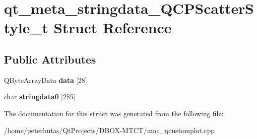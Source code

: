 \hypertarget{structqt__meta__stringdata___q_c_p_scatter_style__t}{}\section{qt\+\_\+meta\+\_\+stringdata\+\_\+\+Q\+C\+P\+Scatter\+Style\+\_\+t Struct Reference}
\label{structqt__meta__stringdata___q_c_p_scatter_style__t}
\subsection*{Public Attributes}
\begin{DoxyCompactItemize}
\item 
\mbox{\label{structqt__meta__stringdata___q_c_p_scatter_style__t_acb6d48bc3c9529aa0eecc8d37930f3c6}} 
Q\+Byte\+Array\+Data {\bfseries data} \mbox{[}28\mbox{]}
\item 
\mbox{\label{structqt__meta__stringdata___q_c_p_scatter_style__t_a6689ed585bd8409634a978fad9b94c3a}} 
char {\bfseries stringdata0} \mbox{[}285\mbox{]}
\end{DoxyCompactItemize}


The documentation for this struct was generated from the following file\+:\begin{DoxyCompactItemize}
\item 
/home/peterhutas/\+Qt\+Projects/\+D\+B\+O\+X-\/\+M\+T\+C\+T/moc\+\_\+qcustomplot.\+cpp\end{DoxyCompactItemize}
